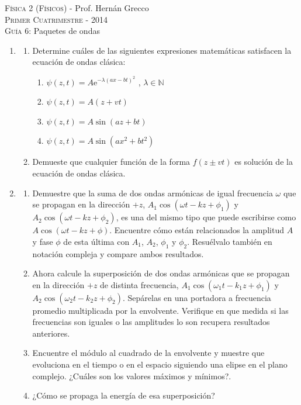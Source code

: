 \documentclass[11pt,spanish,a4paper]{article}
\begin{document}
\begin{center}
	\textsc{\large Física 2 (Físicos)} - Prof. Hernán Grecco\\
	\textsc{\large Primer Cuatrimestre - 2014}\\
	\textsc{\large Guía 6:}	Paquetes de ondas
\end{center}

\begin{enumerate}
\item
\begin{enumerate}
	\item Determine cuáles de las siguientes expresiones matemáticas satisfacen la ecuación de ondas clásica:
	\begin{enumerate}
		\item \(\psi(z,t)= A \mathrm{e}^{-\lambda (a x- b t)^2}\) , \(\lambda \in \mathbb{N} \)
		\item \(\psi(z,t)= A (z+ v t ) \)
		\item \(\psi(z,t)= A \sin{\left( a z+ b t \right) } \)
		\item \(\psi(z,t)= A \sin{\left( a x^2+ b t^2 \right) } \)
	\end{enumerate}
	\item Demueste que cualquier función de la forma \(f(z \pm v t ) \) es solución de la ecuación de ondas clásica.
\end{enumerate}



\item 
	\begin{enumerate}
		\item Demuestre que la suma de dos ondas armónicas de igual frecuencia \( \omega \) que se propagan en la dirección \(+z\), \(A_1 \cos{\left( \omega t - k z + \phi_1 \right) } \) y \( A_2 \cos{\left( \omega t - k z + \phi_2 \right) } \), es una del mismo tipo que puede escribirse como \( A \cos{\left( \omega t - k z + \phi \right) } \).
		Encuentre cómo están relacionados la amplitud \(A\) y fase \(\phi\) de esta última con \(A_1\), \(A_2\), \(\phi_1\) y \(\phi_2\).
		Resuélvalo también en notación compleja y compare ambos resultados.
	\item Ahora calcule la superposición de dos ondas armónicas que se propagan en la dirección \(+z\) de distinta frecuencia, \(A_1 \cos{\left( \omega_1 t - k_1 z + \phi_1 \right) } \) y \(A_2 \cos{\left( \omega_2 t - k_2 z + \phi_2 \right) } \).
		Sepárelas en una portadora a frecuencia promedio multiplicada por la envolvente.
		Verifique en que medida si las frecuencias son iguales o las amplitudes lo son recupera resultados anteriores.
		\item Encuentre el módulo al cuadrado de la envolvente y muestre que evoluciona en el tiempo o en el espacio siguiendo una elipse en el plano complejo.
		¿Cuáles son los valores máximos y mínimos?.
		\item ¿Cómo se propaga la energía de esa superposición?
	\end{enumerate}
		



\end{enumerate}
\end{document}
